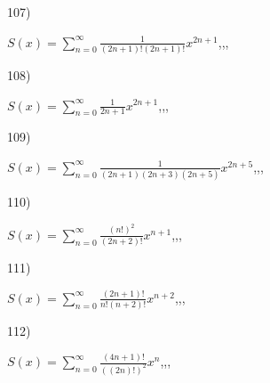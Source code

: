 \documentclass[11pt, ukrainian]{article}
\begin{document}
\par
\vspace{0.9cm}
107) \space 
{%
{$S(x)=\sum\limits_{n=0}^{\infty}{\frac{1}{(2n+1)!(2n+1)!}}{x^{{2n+1}}}$},,, \par \smallskip  
}
\par
\vspace{0.9cm}
108) \space 
{%
{$S(x)=\sum\limits_{n=0}^{\infty}{\frac{1}{2n+1}}{x^{{2n+1}}}$},,, \par \smallskip  
}
\par
\vspace{0.9cm}
109) \space 
{%
{$S(x)=\sum\limits_{n=0}^{\infty}{\frac{1}{(2n+1)(2n+3)(2n+5)}}{x^{{2n+5}}}$},,, \par \smallskip  
}
\par
\vspace{0.9cm}
110) \space 
{%
{$S(x)=\sum\limits_{n=0}^{\infty}{\frac{(n!)^2}{(2n+2)!}}{x^{{n+1}}}$},,, \par \smallskip  
}
\par
\vspace{0.9cm}
111) \space 
{%
{$S(x)=\sum\limits_{n=0}^{\infty}{\frac{(2n+1)!}{n!(n+2)!}}{x^{{n+2}}}$},,, \par \smallskip  
}
\par
\vspace{0.9cm}
112) \space 
{%
{$S(x)=\sum\limits_{n=0}^{\infty}{\frac{(4n+1)!}{((2n)!)^2}}{x^{{n}}}$},,, \par \smallskip  
}
\end{document}
